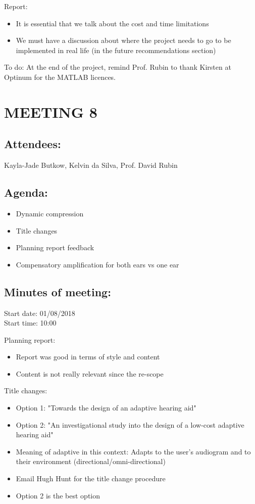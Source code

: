 \documentclass[10pt,onecolumn]{witseiepaper}
\begin{document}
Report:
\begin{itemize}
	\item It is essential that we talk about the cost and time limitations
	\item We must have a discussion about where the project needs to go to be implemented in real life (in the future recommendations section)
\end{itemize}

To do:
At the end of the project, remind Prof. Rubin to thank Kirsten at Optinum for the MATLAB licences.

\section*{MEETING 8}
\subsection*{Attendees:}
Kayla-Jade Butkow, Kelvin da Silva, Prof. David Rubin
\subsection*{Agenda:} 
\begin{itemize}
	\item Dynamic compression
	\item Title changes
	\item Planning report feedback
	\item Compensatory amplification for both ears vs one ear
\end{itemize}

\subsection*{Minutes of meeting:}
Start date: 01/08/2018 \\
Start time: 10:00

Planning report:
\begin{itemize}
	\item Report was good in terms of style and content
	\item Content is not really relevant since the re-scope
\end{itemize}

Title changes:
\begin{itemize}
	\item Option 1: "Towards the design of an adaptive hearing aid"
	\item Option 2: "An investigational study into the design of a low-cost adaptive hearing aid"
	\item Meaning of adaptive in this context: Adapts to the user's audiogram and to their environment (directional/omni-directional)
	\item Email Hugh Hunt for the title change procedure 
	\item Option 2 is the best option
\end{itemize}
\end{document}
